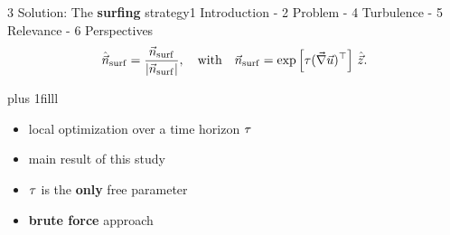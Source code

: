 \begin{frame}{3 Solution: The \textbf{surfing} strategy}{1 Introduction - 2 Problem - 4 Turbulence - 5 Relevance - 6 Perspectives}
	\centering
	\vspace{20pt}
	\begin{equation*}
		\label{eq:optimal_swimming_direction}
		\hat{\vec{n}}_{\mathrm{surf}} = \frac{\vec{n}_{\mathrm{surf}}}{\lvert\vec{n}_{\mathrm{surf}}\rvert}, \quad \text{with} \quad \vec{n}_{\mathrm{surf}} = \exp \left[ \tau (\vec{\nabla} \vec{u})^\top \right] \, \hat{\vec{z}}.
	\end{equation*}

	\vskip0pt plus 1filll
	
	\begin{itemize}
		\large
		\setlength\itemsep{10pt}
		\item<1-> local optimization over a time horizon $\tau$
		\item<2-> main result of this study
		\item<3-> $\tau$ is the \textbf{only} free parameter
		\item<4-> \textbf{brute force} approach
	\end{itemize}
	\vspace{25pt}
\end{frame}

% 
% 
% 
